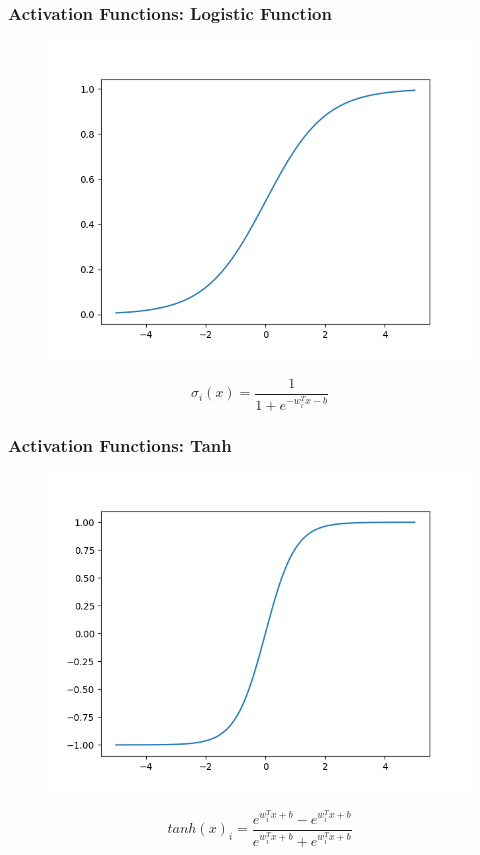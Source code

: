 \documentclass{beamer}
\begin{document}
\begin{frame}[fragile]
\frametitle{Activation Functions: Logistic Function}
\begin{figure}
		\includegraphics[scale=.4]{Images/Output/sigmoid.png}
\end{figure}
		\begin{equation}
			\sigma_i(x) = \frac{1}{1+e^{-w_{i}^{T}x-b}}
		\end{equation}
\end{frame}


\begin{frame}[fragile]
\frametitle{Activation Functions: Tanh}
\begin{figure}
		\includegraphics[scale=.4]{Images/Output/tanh.png}
\end{figure}
		\begin{equation}
			tanh(x)_i = \frac{e^{w_{i}^{T}x+b}-e^{w_{i}^{T}x+b}}{e^{w_{i}^{T}x+b}+e^{w_{i}^{T}x+b}}
		\end{equation}
		\cite{lecun2012efficient}
\end{frame}
\end{document}
